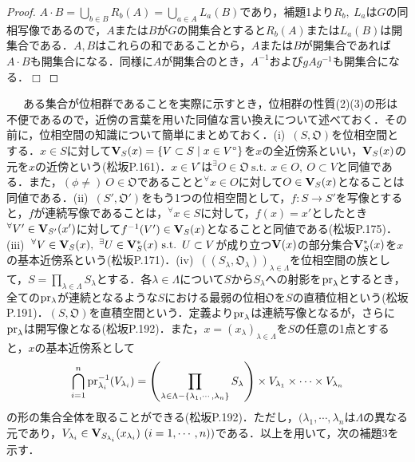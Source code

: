 \documentclass[a4paper,11pt]{jsarticle}
\newtheorem{proof}{証明}
\def\qed{\hfill $\Box$}
\newcommand{\st}{\mathrm{s.t.}\,}  %
\begin{document}
\vspace{-1zh}%
\vspace{-1zh}%
\begin{proof}
$A\cdot B=\underset{b\in B}{\bigcup}R_b(A)=\underset{a\in A}{\bigcup}L_a(B)$であり，補題1より$R_b,{\ }L_a$は$G$の同相写像であるので，$A$または$B$が$G$の開集合とすると$R_b(A)$または$L_a(B)$は開集合である．$A,B$はこれらの和であることから，$A$または$B$が開集合であれば$A\cdot B$も開集合になる．同様に$A$が開集合のとき，$A^{-1}$および$gAg^{-1}$も開集合になる．\qed
\end{proof}
%
%
%
{\ }{\ }{\ }ある集合が位相群であることを実際に示すとき，位相群の性質(2)(3)の形は不便であるので，近傍の言葉を用いた同値な言い換えについて述べておく．その前に，位相空間の知識について簡単にまとめておく．(i){\ }$(S,\mathfrak{O})$を位相空間とする．$x\in S$に対して${\bf V}_S(x)=\{V\subset S \mid x\in V^\circ\}$を$x$の全近傍系といい，${\bf V}_S(x)$の元を$x$の近傍という(松坂P.161)．$x\in V^\circ$は$^\exists O\in \mathfrak{O}{\ }\st{\ }x\in O,{\ }O\subset V$と同値である．また，$(\phi\neq){\ }O\in\mathfrak{O}$であることと$^\forall x\in O$に対して$O\in{\bf V}_S(x)$となることは同値である．(ii){\ }$(S',\mathfrak{O}')$をもう1つの位相空間として，$f:S\to S'$を写像とすると，$f$が連続写像であることは，$^\forall x\in S$に対して，$f(x)=x'$としたとき$^\forall V'\in {\bf V}_{S'}(x')$に対して$f^{-1}(V')\in {\bf V}_S(x)$となることと同値である(松坂P.175)．(iii){\ }$^\forall V\in {\bf V}_S(x),{\ } ^\exists U\in {\bf V}_S^\ast(x){\ }\st{\ }U\subset V$が成り立つ${\bf V}(x)$の部分集合${\bf V}_S^\ast(x)$を$x$の基本近傍系という(松坂P.171)．(iv){\ }$((S_\lambda,\mathfrak{O}_\lambda))_{\lambda\in\Lambda}$を位相空間の族として，$S=\underset{\lambda\in\Lambda}{\prod}S_\lambda$とする．各$\lambda\in\Lambda$について$S$から$S_\lambda$への射影を${\rm pr}_\lambda$とするとき，全ての${\rm pr_\lambda}$が連続となるような$S$における最弱の位相$\mathfrak{O}$を$S$の直積位相という(松坂P.191)．$(S,\mathfrak{O})$を直積空間という．定義より${\rm pr}_\lambda$は連続写像となるが，さらに${\rm pr}_\lambda$は開写像となる(松坂P.192)．また，$x=(x_\lambda)_{\lambda\in\Lambda}$を$S$の任意の1点とすると，$x$の基本近傍系として
\begin{equation*}
\bigcap_{i=1}^n {\rm pr}_{\lambda_i}^{-1}(V_{\lambda_i})=\left(\prod_{\lambda\in\Lambda-\{\lambda_1,\cdots,\lambda_n\}}S_\lambda\right)\times V_{\lambda_1}\times\cdots\times V_{\lambda_n}
\end{equation*}
の形の集合全体を取ることができる(松坂P.192)．ただし，$(\lambda_1,\cdots,\lambda_n$は$\Lambda$の異なる元であり，$V_{\lambda_i}\in{\bf V}_{S_{\lambda_i}}(x_{\lambda_i}){\ }(i=1,\cdots,n))$である．以上を用いて，次の補題3を示す．
\end{document}
